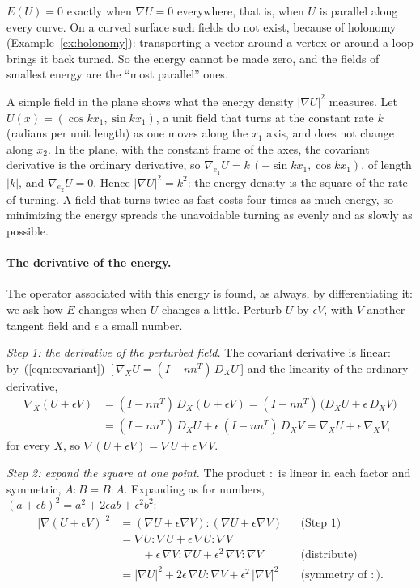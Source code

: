 $E(U) = 0$ exactly when $\nabla U = 0$ everywhere, that is, when $U$ is parallel along every curve. On a curved surface such fields do not exist, because of holonomy (Example~\ref{ex:holonomy}): transporting a vector around a vertex or around a loop brings it back turned. So the energy cannot be made zero, and the fields of smallest energy are the ``most parallel'' ones.

A simple field in the plane shows what the energy density $|\nabla U|^2$ measures. Let $U(x) = (\cos kx_1, \sin kx_1)$, a unit field that turns at the constant rate $k$ (radians per unit length) as one moves along the $x_1$ axis, and does not change along $x_2$. In the plane, with the constant frame of the axes, the covariant derivative is the ordinary derivative, so $\nabla_{e_1} U = k\,(-\sin kx_1, \cos kx_1)$, of length $|k|$, and $\nabla_{e_2} U = 0$. Hence $|\nabla U|^2 = k^2$: the energy density is the square of the rate of turning. A field that turns twice as fast costs four times as much energy, so minimizing the energy spreads the unavoidable turning as evenly and as slowly as possible.

\paragraph{The derivative of the energy.} The operator associated with this energy is found, as always, by differentiating it: we ask how $E$ changes when $U$ changes a little. Perturb $U$ by $\epsilon V$, with $V$ another tangent field and $\epsilon$ a small number.

\emph{Step 1: the derivative of the perturbed field.} The covariant derivative is linear: by~(\ref{eqn:covariant})~[\,$\nabla_X U = (I - nn^T)\,D_X U$\,] and the linearity of the ordinary derivative,
\begin{align*}
\nabla_X (U + \epsilon V) &= (I - nn^T)\, D_X(U + \epsilon V) = (I - nn^T)\,\big( D_X U + \epsilon\, D_X V \big) \\
&= (I - nn^T)\, D_X U + \epsilon\, (I - nn^T)\, D_X V = \nabla_X U + \epsilon\,\nabla_X V ,
\end{align*}
for every $X$, so $\nabla(U + \epsilon V) = \nabla U + \epsilon\,\nabla V$.

\emph{Step 2: expand the square at one point.} The product $:$ is linear in each factor and symmetric, $A : B = B : A$. Expanding as for numbers, $(a + \epsilon b)^2 = a^2 + 2\epsilon ab + \epsilon^2 b^2$:
\begin{align*}
|\nabla(U + \epsilon V)|^2 &= (\nabla U + \epsilon\nabla V) : (\nabla U + \epsilon\nabla V) && \text{(Step 1)} \\
&= \nabla U : \nabla U + \epsilon\, \nabla U : \nabla V \\
&\qquad + \epsilon\, \nabla V : \nabla U + \epsilon^2\, \nabla V : \nabla V && \text{(distribute)} \\
&= |\nabla U|^2 + 2\epsilon\, \nabla U : \nabla V + \epsilon^2\, |\nabla V|^2 && \text{(symmetry of } : \text{)} .
\end{align*}


